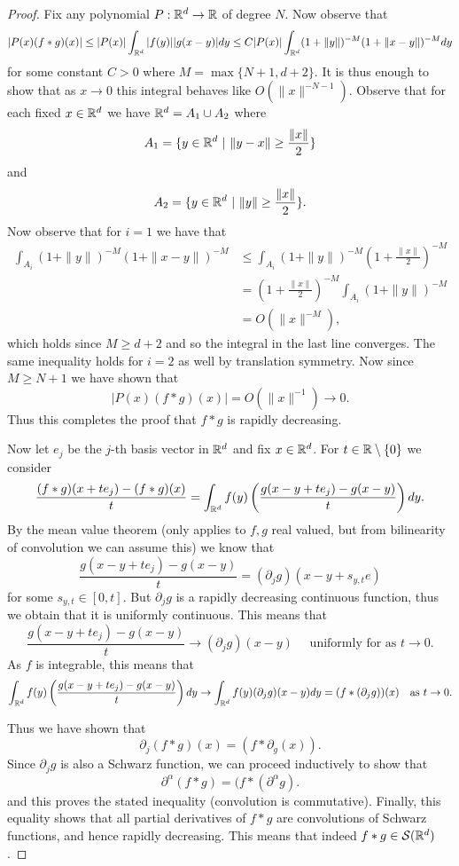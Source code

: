 \documentclass[twoside, a4paper, 10pt]{amsart}
\begin{document}
\begin{proof} Fix any polynomial $P:\mathbb{R}^d \to \mathbb{R}$ of degree $N$. Now observe that $$|P(x)(f*g)(x)| \leq |P(x)| \int_{\mathbb{R}^d} |f(y)||g(x-y)|dy \leq C |P(x)| \int_{\mathbb{R}^d} (1+\|y\|)^{-M} (1+\|x-y\|)^{-M}dy $$ for some constant $C>0$ where $M = \max\{N+1, d+2\}$. It is thus enough to show that as $x \to 0$ this integral behaves like $O(\|x\|^{-N-1})$. Observe that for each fixed $x \in \mathbb{R}^d$ we have $\mathbb{R}^d = A_1 \cup A_2$ where $$A_1 = \{y \in \mathbb{R}^d ~|~ \|y - x\| \geq \frac{\|x\|}{2} \}$$ and $$A_2 = \{ y \in \mathbb{R}^d ~|~ \|y \| \geq \frac{\|x\|}{2}\}.$$  Now observe that for $i=1$ we have that \begin{align*} \int_{A_i}(1+\|y\|)^{-M} (1+\|x-y\|)^{-M} &\leq \int_{A_i} (1+\|y\|)^{-M}\left(1+\frac{\|x\|}{2}\right)^{-M} \\ &=\left(1+\frac{\|x\|}{2}\right)^{-M} \int_{A_i} (1+\|y\|)^{-M} \\&= O(\|x\|^{-M}),\end{align*} which holds since $M\geq d+2$ and so the integral in the last line converges. The same inequality holds for $i=2$ as well by translation symmetry. Now since $M \geq N+1$ we have shown that $$|P(x)(f*g)(x)| = O(\|x\|^{-1}) \to 0.$$ Thus this completes the proof that $f*g$ is rapidly decreasing.

Now let $e_j$ be the $j$-th basis vector in $\mathbb{R}^d$ and fix $x \in \mathbb{R}^d$. For $t \in \mathbb{R} \setminus \{0\}$ we consider $$\frac{(f*g)(x+te_j) - (f*g)(x)}{t} = \int_{\mathbb{R}^d}f(y)\left(\frac{g(x-y+te_j) - g(x-y)}{t} \right) dy.$$ By the mean value theorem (only applies to $f,g$ real valued, but from bilinearity of convolution we can assume this) we know that $$\frac{g(x-y+te_j) - g(x-y)}{t} = (\partial_j g)(x-y + s_{y,t}e)$$ for some $s_{y,t} \in [0,t]$. But $\partial_j g$ is a rapidly decreasing continuous function, thus we obtain that it is uniformly continuous. This means that $$\frac{g(x-y+te_j) - g(x-y)}{t} \to (\partial_jg)(x-y) \quad \text{ uniformly for as } t \to 0.$$ As $f$ is integrable, this means that $$\int_{\mathbb{R}^d}f(y)\left(\frac{g(x-y+te_j) - g(x-y)}{t} \right) dy \to \int_{\mathbb{R}^d} f(y)(\partial_jg)(x-y) dy = (f*(\partial_jg))(x) \quad \text{as } t\to 0.$$

Thus we have shown that $$\partial_j (f*g)(x) = (f*\partial_g(x)).$$ Since $\partial_j g$ is also a Schwarz function, we can proceed inductively to show that $$\partial^{\alpha} (f * g) = (f *(\partial^{\alpha} g).$$ and this proves the stated inequality (convolution is commutative). Finally, this equality shows that all partial derivatives of $f*g$ are convolutions of Schwarz functions, and hence rapidly decreasing. This means that indeed $f*g \in \mathcal{S}(\mathbb{R}^d)$. \end{proof}
\end{document}
